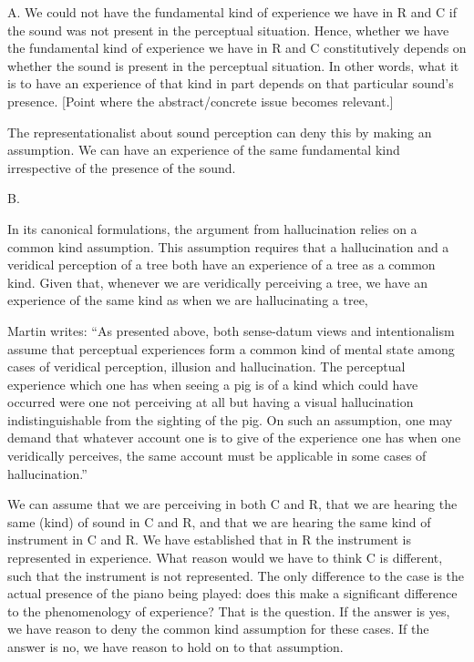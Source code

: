\documentclass[sloppy, journal, git, bytitle, dodraft]{humapap}
\begin{document}
A. We could not have the fundamental kind of experience we have in R and C if the sound was not present in the perceptual situation. Hence, whether we have the fundamental kind of experience we have in R and C constitutively depends on whether the sound is present in the perceptual situation. In other words, what it is to have an experience of that kind in part depends on that particular sound's presence. [Point where the abstract/concrete issue becomes relevant.]

The representationalist about sound perception can deny this by making an assumption. We can have an experience of the same fundamental kind irrespective of the presence of the sound. 

B. 



In its canonical formulations, the argument from hallucination relies on a common kind assumption. This assumption requires that a hallucination and a veridical perception of a tree both have an experience of a tree as a common kind. Given that, whenever we are veridically perceiving a tree, we have an experience of the same kind as when we are hallucinating a tree,

Martin writes: ``As presented above, both sense-datum views and intentionalism assume that perceptual experiences form a common kind of mental state among cases of veridical perception, illusion and hallucination. The perceptual experience which one has when seeing a pig is of a kind which could have occurred were one not perceiving at all but having a visual hallucination indistinguishable from the sighting of the pig. On such an assumption, one may demand that whatever account one is to give of the experience one has when one veridically perceives, the same account must be applicable in some cases of hallucination.''

We can assume that we are perceiving in both C and R, that we are hearing the same (kind) of sound in C and R, and that we are hearing the same kind of instrument in C and R. We have established that in R the instrument is represented in experience. What reason would we have to think C is different, such that the instrument is not represented. The only difference to the case is the actual presence of the piano being played: does this make a significant difference to the phenomenology of experience? That is the question. If the answer is yes, we have reason to deny the common kind assumption for these cases. If the answer is no, we have reason to hold on to that assumption. 
\end{document}
